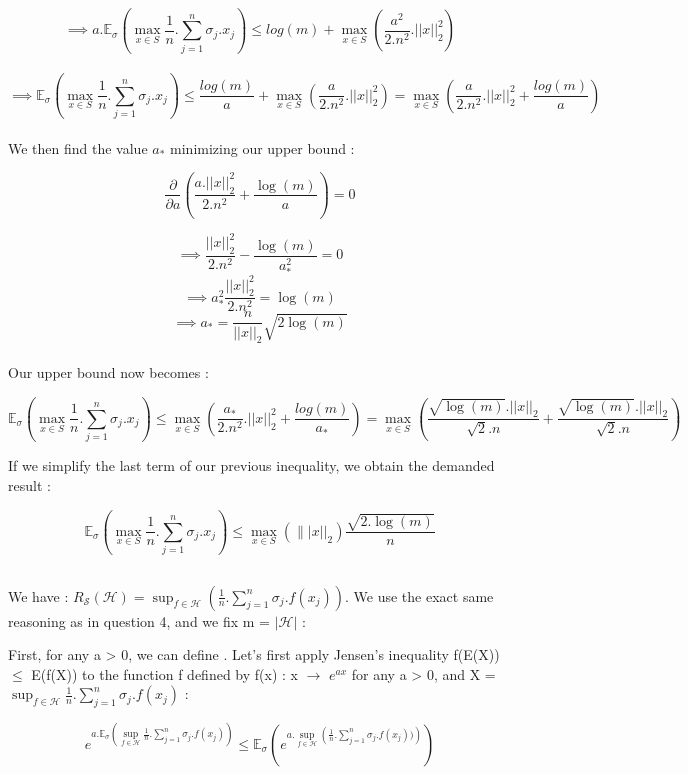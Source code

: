 \documentclass[final,3p,times,12pt]{article}
\begin{document}
\[ \implies
a.\mathbb{E}_{\sigma}\left(\max_{x\in S} \frac{1}{n}.\sum_{j=1}^n \sigma_j.x_j\right) \leq log(m)+\max_{x\in S}\left(\frac{a^2}{2.n^2}.||x||_2^2\right)
\] \\

\[ \implies
\mathbb{E}_{\sigma}\left(\max_{x\in S} \frac{1}{n}.\sum_{j=1}^n \sigma_j.x_j\right) \leq \frac{log(m)}{a}+ \max_{x\in S}(\frac{a}{2.n^2}.||x||_2^2) = \max_{x\in S}(\frac{a}{2.n^2}.||x||_2^2 + \frac{log(m)}{a})
\] \\

We then find the value $a_*$ minimizing our upper bound :

\[
\frac{\partial}{\partial a} \left( \frac{a.||x||_2^2}{2.n^2} + \frac{\log(m)}{a}\right) = 0
\]

\[ \implies
\frac{||x||_2^2}{2.n^2} -\frac{\log(m)}{a_*^2}  = 0
\]
\[ \implies
a_*^2 \frac{||x||_2^2}{2.n^2} = \log(m)
\]
\[ \implies
a_* = \frac{n}{||x||_2} \sqrt{2 \log(m)}
\]\\

Our upper bound now becomes : 

\[
\mathbb{E}_{\sigma}\left(\max_{x\in S} \frac{1}{n}.\sum_{j=1}^n \sigma_j.x_j\right) \leq \max_{x\in S}\left(\frac{a_*}{2.n^2}.||x||_2^2 + \frac{log(m)}{a_*}\right) = \max_{x\in S}\left(\frac{\sqrt{\log(m)}.||x||_2}{\sqrt{2}.n} + \frac{\sqrt{\log(m)}.||x||_2}{\sqrt{2}.n}\right)
\]

If we simplify the last term of our previous inequality, we obtain the demanded result : 

\[
\mathbb{E}_{\sigma}\left(\max_{x\in S} \frac{1}{n}.\sum_{j=1}^n \sigma_j.x_j\right) \leq \max_{x\in S}\left(\||x||_2\right)\frac{\sqrt{2.\log(m)}}{n}
\]

\subsection{} 

We have : $ R_{\mathcal{S}}(\mathcal{H}) = \sup_{f\in \mathcal{H}}\left(\frac{1}{n}.\sum_{j=1}^n \sigma_j.f(x_j)\right)$. We use the exact same reasoning as in question 4, and we fix m = $|\mathcal{H}|$ : 

First, for any a > 0, we can define . Let's first apply Jensen's inequality f(E(X)) $\leq$ E(f(X)) to the function f defined by f(x) : x $\rightarrow$ $e^{ax}$ for any a > 0, and X = $\sup_{f\in \mathcal{H}} \frac{1}{n}.\sum_{j=1}^n \sigma_j.f(x_j)$ : 

\[
e^{a.\mathbb{E}_{\sigma}\left(\sup_{f\in \mathcal{H}} \frac{1}{n}.\sum_{j=1}^n \sigma_j.f(x_j)\right)} \leq \mathbb{E}_{\sigma}\left(e^{a.\sup_{f\in \mathcal{H}} \left(\frac{1}{n}.\sum_{j=1}^n \sigma_j.f(x_j))\right)}\right)
\]
\end{document}
